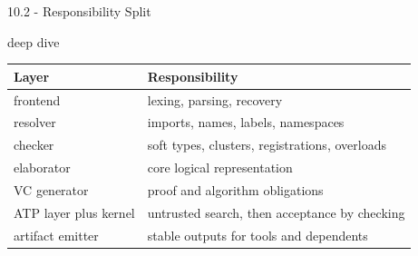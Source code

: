 \documentclass[aspectratio=169,11pt]{beamer}
\newcommand{\deepdivetag}{\hfill\colorbox{black!15}{\textcolor{black!65}{\strut\scriptsize\sffamily deep dive}}}
\begin{document}
\begin{frame}[fragile,t]{10.2 - Responsibility Split\deepdivetag}
\begin{footnotesize}
\setlength{\tabcolsep}{3pt}
\renewcommand{\arraystretch}{1.15}
\begin{tabularx}{\textwidth}{>{\raggedright\arraybackslash}X>{\raggedright\arraybackslash}X}
\toprule
\textbf{Layer} & \textbf{Responsibility} \\
\midrule
frontend & lexing, parsing, recovery \\
resolver & imports, names, labels, namespaces \\
checker & soft types, clusters, registrations, overloads \\
elaborator & core logical representation \\
VC generator & proof and algorithm obligations \\
ATP layer plus kernel & untrusted search, then acceptance by checking \\
artifact emitter & stable outputs for tools and dependents \\
\bottomrule
\end{tabularx}
\end{footnotesize}

\end{frame}
\end{document}

